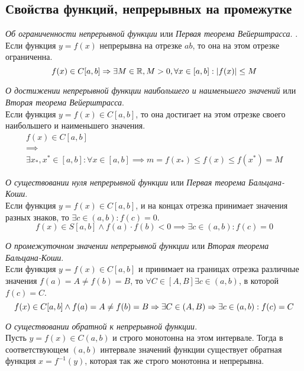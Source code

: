 \subsection{Свойства функций, непрерывных на промежутке}

\begin{theorem}
  \textit{Об ограниченности непрерывной функции} или \textit{Первая теорема Вейерштрасса}. . \\
  Если функция $y = f(x)$ непрерывна на отрезке $ab$, то она на этом отрезке ограниченна. \[
    f(x) \in C[a, b] \implies \exists M \in \R, M > 0, \forall x \in [a, b] : |f(x)| \le  M
  \] 
\end{theorem}

\begin{theorem}
  \textit{О достижении непрерывной функции наибольшего и наименьшего значений} или \textit{Вторая теорема Вейерштрасса}. \\
  Если функция $y = f(x) \in C[a, b]$, то она достигает на этом отрезке своего наибольшего и наименьшего значения.
  \begin{gather*}
    f(x) \in C[a, b] \\
    \implies \\
    \exists x_*, x^* \in [a, b] : \forall x \in [a, b] \implies m = f(x_*) \le f(x) \le f(x^*) = M
  \end{gather*}
\end{theorem}

\begin{theorem}
  \textit{О существовании нуля непрерывной функции} или \textit{Первая теорема Бальцана-Коши}. \\
  Если функция $y = f(x) \in C[a, b]$, и на концах отрезка принимает значения разных знаков, то $\exists c \in (a, b) : f(c) = 0$. \[
    f(x) \in S[a, b] \land f(a) \cdot f(b) < 0 \implies \exists  c \in (a, b) : f(c) = 0
  \] 
\end{theorem}

\begin{theorem}
  \textit{О промежуточном значении непрерывной функции} или \textit{Вторая теорема Бальцана-Коши}. \\
  Если функция $y = f(x) \in C[a, b]$ и принимает на границах отрезка различные значения $f(a) = A \neq f(b) = B$, то $\forall C \in [A, B] \exists c \in (a, b)$, в которой $f(c) = C$.  \[
    f(x) \in C[a, b] \land f(a) = A \neq f(b) = B \\
    \implies \\
    \exists C \in (A, B) \implies \exists c \in (a, b) : f(c) = C
  \] 
\end{theorem}

\begin{theorem}
  \textit{О существовании обратной к непрерывной функции}. \\
  Пусть $y = f(x) \in C(a, b)$ и строго монотонна на этом интервале. Тогда в соответствующем $(a, b)$ интервале значений функции существует обратная функция $x = f^{-1}(y)$, которая так же строго монотонна и непрерывна.
\end{theorem}

